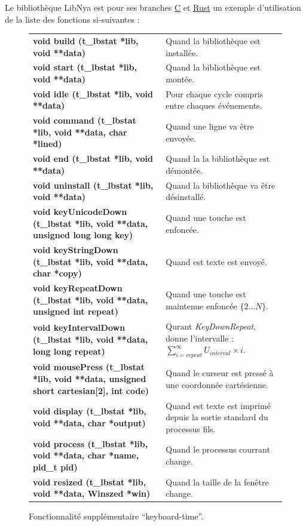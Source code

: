 \documentclass{report}
\newcommand{\violet}{\rowcolor{violet!10}}
\begin{document}
Le bibliothèque LibNya est pour ses branches \href{https://github.com/Arukana/LibNya/tree/c}{C} et \href{https://github.com/Arukana/LibNya}{Rust} un exemple d'utilisation de la liste des fonctions si-suivantes : \\

\begin{figure}[!ht]
    \begin{minipage}{\textwidth}
    \centering
        \begin{tabular}{p{}p{}}
            \textbf{void build (t\_lbstat *lib, void **data)} & Quand la bibliothèque est installée. \\
            \textbf{void start (t\_lbstat *lib, void **data)} & Quand la bibliothèque est montée. \\
            \textbf{void idle (t\_lbstat *lib, void **data)} & Pour chaque cycle compris entre chaques événements. \\
            \textbf{void command (t\_lbstat *lib, void **data, char *lined)} & Quand une ligne va être envoyée. \\
            \textbf{void end (t\_lbstat *lib, void **data)} & Quand la la bibliothèque est démontée. \\
            \textbf{void uninstall (t\_lbstat *lib, void **data)} & Quand la bibliothèque va être désinstallé. \\
            \textbf{void keyUnicodeDown (t\_lbstat *lib, void **data, unsigned long long key)} & Quand une touche est enfoncée. \\
            \textbf{void keyStringDown (t\_lbstat *lib, void **data, char *copy)} & Quand est texte est envoyé. \\
            \violet
            \textbf{void keyRepeatDown (t\_lbstat *lib, void **data, unsigned int repeat)} & Quand une touche est maintenue enfoncée $\{2\dots{}N\}$. \\
            \violet
            \textbf{void keyIntervalDown (t\_lbstat *lib, void **data, long long repeat)} & Qurant \textit{KeyDownRepeat}, donne l'intervalle : $\sum_{i=repeat}^{\infty} U_{interval}\times{}i$. \\
            \textbf{void mousePress (t\_lbstat *lib, void **data, unsigned short cartesian[2], int code)} & Quand le curseur est pressé à une coordonnée cartésienne. \\
            \textbf{void display (t\_lbstat *lib, void **data, char *output)} & Quand est texte est imprimé depuis la sortie standard du processus fils. \\
            \textbf{void process (t\_lbstat *lib, void **data, char *name, pid\_t pid)} & Quand le processus courrant change. \\
            \textbf{void resized (t\_lbstat *lib, void **data, Winszed *win)} & Quand la taille de la fenêtre change. \\
        \end{tabular}
    \end{minipage}
   \caption[Caption]{ \colorbox{violet!10}{\phantom{\_}} Fonctionnalité supplémentaire \enquote{keyboard-time}.}
\end{figure}
\end{document}
